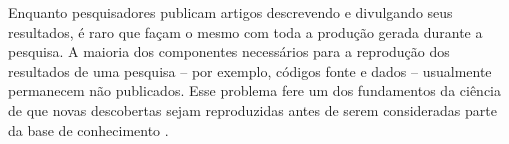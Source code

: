 %
%
%



Enquanto pesquisadores publicam artigos descrevendo e divulgando seus
resultados, é raro que façam o mesmo com toda a produção gerada durante a
pesquisa. A maioria dos componentes necessários para a reprodução dos
resultados de uma pesquisa -- por exemplo, códigos fonte e dados -- usualmente
permanecem não publicados. Esse problema fere um dos fundamentos
da ciência de que novas descobertas sejam reproduzidas antes de serem
consideradas parte da base de conhecimento \cite{Stodden2009}.

